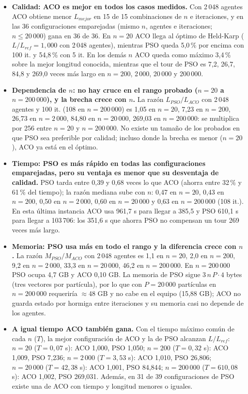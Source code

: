 \begin{itemize}
\item \textbf{Calidad: ACO es mejor en todos los casos medidos.} Con 2\,048 agentes ACO obtiene menor $L_{mejor}$ en 15 de 15 combinaciones de $n$ e iteraciones, y en las 36 configuraciones emparejadas (mismo $n$, agentes e iteraciones; $n\le20\,000$) gana en 36 de 36. En $n=20$ ACO llega al óptimo de Held-Karp ($L/L_{ref}=1,000$ con 2\,048 agentes), mientras PSO queda 5,0\,\% por encima con 100 it. y 54,8\,\% con 5 it. En los demás $n$ ACO queda como máximo 3,4\,\% sobre la mejor longitud conocida, mientras que el tour de PSO es 7,2, 26,7, 84,8 y 269,0 veces más largo en $n=200$, 2\,000, 20\,000 y 200\,000.
\item \textbf{Dependencia de $n$: no hay cruce en el rango probado ($n=20$ a $n=200\,000$), y la brecha crece con $n$.} La razón $L_{PSO}/L_{ACO}$ con 2\,048 agentes y 100 it. (108 en $n=200\,000$) es 1,05 en $n=20$, 7,23 en $n=200$, 26,73 en $n=2\,000$, 84,80 en $n=20\,000$, 269,03 en $n=200\,000$: se multiplica por 256 entre $n=20$ y $n=200\,000$. No existe un tamaño de los probados en que PSO sea preferible por calidad; incluso donde la brecha es menor ($n=20$), ACO ya está en el óptimo.
\item \textbf{Tiempo: PSO es más rápido en todas las configuraciones emparejadas, pero su ventaja es menor que su desventaja de calidad.} PSO tarda entre 0,39 y 0,68 veces lo que ACO (ahorra entre 32\,\% y 61\,\% del tiempo); la razón mediana sube con $n$: 0,47 en $n=20$, 0,43 en $n=200$, 0,50 en $n=2\,000$, 0,60 en $n=20\,000$ y 0,63 en $n=200\,000$ (108 it.). En esta última instancia ACO usa 961,7 s para llegar a 385,5 y PSO 610,1 s para llegar a 103\,706: los 351,6 s que ahorra PSO no compensan un tour 269 veces más largo.
\item \textbf{Memoria: PSO usa más en todo el rango y la diferencia crece con $n$.} La razón $M_{PSO}/M_{ACO}$ con 2\,048 agentes es 1,1 en $n=20$, 2,0 en $n=200$, 9,2 en $n=2\,000$, 33,3 en $n=20\,000$, 46,2 en $n=200\,000$. En $n=200\,000$ PSO ocupa 4,7 GB y ACO 0,10 GB. La memoria de PSO sigue $3\,n\,P\cdot4$ bytes (tres vectores por partícula), por lo que con $P=20\,000$ partículas en $n=200\,000$ requeriría $\approx$48 GB y no cabe en el equipo (15,88 GB); ACO no guarda estado por hormiga entre iteraciones y su memoria casi no depende de los agentes.
\item \textbf{A igual tiempo ACO también gana.} Con el tiempo máximo común de cada $n$ ($T$), la mejor configuración de ACO y la de PSO alcanzan $L/L_{ref}$: $n=20$ ($T=0,07$ s): ACO 1,000, PSO 1,050; $n=200$ ($T=0,32$ s): ACO 1,009, PSO 7,236; $n=2\,000$ ($T=3,53$ s): ACO 1,010, PSO 26,806; $n=20\,000$ ($T=42,38$ s): ACO 1,001, PSO 84,844; $n=200\,000$ ($T=610,08$ s): ACO 1,002, PSO 269,031. Además, en 31 de 39 configuraciones de PSO existe una de ACO con tiempo y longitud menores o iguales.

\end{itemize}
